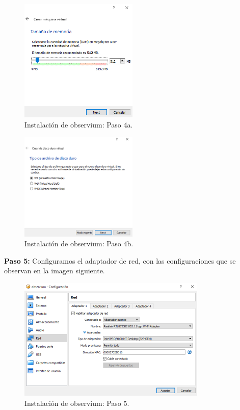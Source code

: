 \begin{figure}[htbp!]
	\centering
		\includegraphics[width=0.5\textwidth]{images/desarrollo/instalarObservium_paso4a.png}
	\caption{Instalación de observium: Paso 4a.}
\end{figure} 

\pagebreak
\begin{figure}[htbp!]
	\centering
		\includegraphics[width=0.5\textwidth]{images/desarrollo/instalarObservium_paso4b.png}
	\caption{Instalación de observium: Paso 4b.}
\end{figure} 

\noindent
\textbf{Paso 5:} Configuramos el adaptador de red, con las configuraciones que se observan en la imagen siguiente. 

\begin{figure}[htbp!]
	\centering
		\includegraphics[width=0.8\textwidth]{images/desarrollo/instalarObservium_paso5.png}
	\caption{Instalación de observium: Paso 5.}
\end{figure} 